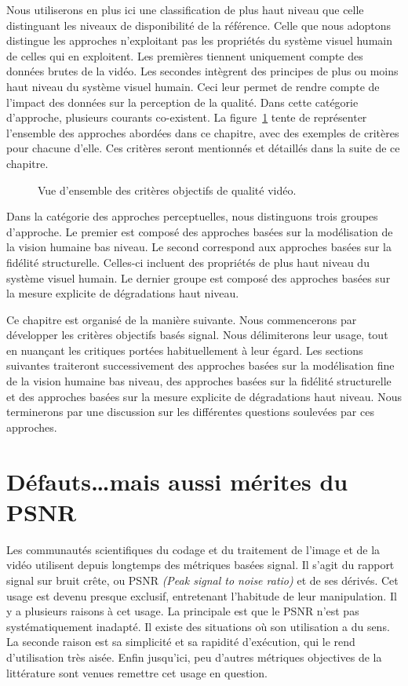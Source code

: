 Nous utiliserons en plus ici une classification de plus haut niveau que celle distinguant les niveaux de disponibilité de la référence. Celle que nous adoptons distingue les approches n'exploitant pas les propriétés du système visuel humain de celles qui en exploitent. Les premières tiennent uniquement compte des données brutes de la vidéo. Les secondes intègrent des principes de plus ou moins haut niveau du système visuel humain. Ceci leur permet de rendre compte de l'impact des données sur la perception de la qualité. Dans cette catégorie d'approche, plusieurs courants co-existent. La figure~\ref{fig:vueGlobale} tente de représenter l'ensemble des approches abordées dans ce chapitre, avec des exemples de critères pour chacune d'elle. Ces critères seront mentionnés et détaillés dans la suite de ce chapitre.

\begin{figure}[htbp]
  \centering
  \begin{tikzpicture}[text centered,scale=1.04]\end{tikzpicture}
  \caption{Vue d'ensemble des critères objectifs de qualité vidéo.}
  \label{fig:vueGlobale}
\end{figure}

Dans la catégorie des approches perceptuelles, nous distinguons trois groupes d'approche. Le premier est composé des approches basées sur la modélisation de la vision humaine bas niveau. Le second correspond aux approches basées sur la fidélité structurelle. Celles-ci incluent des propriétés de plus haut niveau du système visuel humain. Le dernier groupe est composé des approches basées sur la mesure explicite de dégradations haut niveau.

Ce chapitre est organisé de la manière suivante. Nous commencerons par développer les critères objectifs basés signal. Nous délimiterons leur usage, tout en nuançant les critiques portées habituellement à leur égard. Les sections suivantes traiteront successivement des approches basées sur la modélisation fine de la vision humaine bas niveau, des approches basées sur la fidélité structurelle et des approches basées sur la mesure explicite de dégradations haut niveau. Nous terminerons par une discussion sur les différentes questions soulevées par ces approches.


\section{Défauts\dots mais aussi mérites du PSNR} \label{sec:modelesMathematiques}
Les communautés scientifiques du codage et du traitement de l'image et de la vidéo utilisent depuis longtemps des métriques basées signal. Il s'agit du rapport signal sur bruit crête, ou PSNR \emph{(Peak signal to noise ratio)} et de ses dérivés. Cet usage est devenu presque exclusif, entretenant l'habitude de leur manipulation. Il y a plusieurs raisons à cet usage. La principale est que le PSNR n'est pas systématiquement inadapté. Il existe des situations où son utilisation a du sens. La seconde raison est sa simplicité et sa rapidité d'exécution, qui le rend d'utilisation très aisée. Enfin jusqu'ici, peu d'autres métriques objectives de la littérature sont venues remettre cet usage en question.

